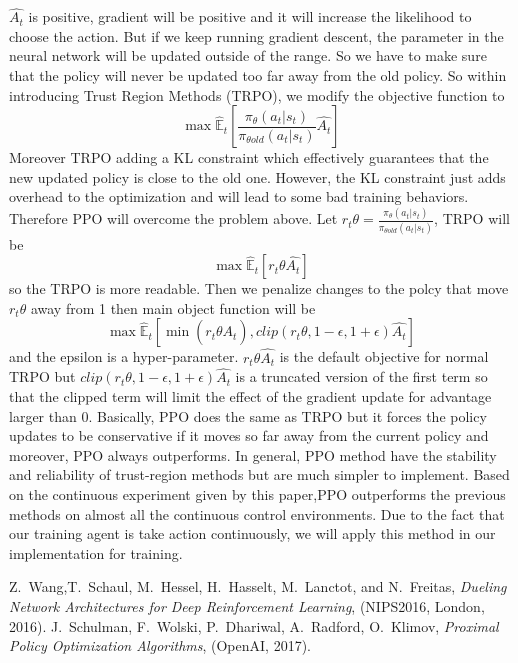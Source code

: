 \documentclass[%
,aps%
 ,twocolumn%
 ,secnumarabic%
,amssymb, amsmath,nobibnotes, aps, prl, floatfix]{revtex4-1}
\begin{document}
$\hat{A_t}$ is positive, gradient will be positive and it will increase the likelihood to choose the action. But if we keep running gradient descent, the parameter in the neural network will be updated outside of the range. So we have to make sure that the policy will never be updated too far away from the old policy. So within introducing Trust Region Methods (TRPO)\cite{SWPRK}, we modify the objective function to $$ \max\hat{\mathbb{E}}_{t}[\frac{\pi_{\theta}(a_{t}|s_{t})}{\pi_{\theta old}(a_{t}|s_{t})}\hat{A_t}] $$Moreover TRPO adding a KL constraint  which effectively guarantees that the new updated policy is close to the old one. However, the KL constraint just adds overhead to the optimization and will lead to some bad training behaviors. Therefore PPO will overcome the problem above.  Let  $r_{t}\theta = \frac{\pi_{\theta}(a_{t}|s_{t})}{\pi_{\theta old}(a_{t}|s_{t})}$, TRPO will be $$ \max\hat{\mathbb{E}}_{t}[r_{t}\theta \hat{A_t}] $$ so the TRPO is more readable. Then we penalize changes to the polcy that move $r_{t}\theta$ away from 1 then main object function will be $$ \max \hat{\mathbb{E}}_{t} [\min(r_{t}\theta \hat{A_t}), clip(r_{t}\theta,1-\epsilon,1+\epsilon)\hat{A_t}]$$ and the epsilon is a hyper-parameter. $r_{t}\theta \hat{A_t}$ is the default objective for normal TRPO but $clip(r_{t}\theta,1-\epsilon,1+\epsilon)\hat{A_t}$ is a truncated version of the first term so that the clipped term will limit the effect of the gradient update for advantage larger than 0\cite{SWPRK}. Basically, PPO does the same as TRPO but it forces the policy updates to be conservative if it moves so far away from the current policy and moreover, PPO always outperforms. In general, PPO method have the stability and reliability of trust-region methods but are much simpler to implement\cite{SWPRK}. Based on the continuous experiment given by this paper,PPO outperforms the previous methods on almost all the continuous control environments. Due to the fact that our training agent is take action continuously, we will apply this method in our implementation for training.


\begin{thebibliography}{}\label{sec:TeXbooks}
 Z.~Wang,T.~Schaul, M.~Hessel, H.~Hasselt, M.~Lanctot, and N.~Freitas, \textit{Dueling Network Architectures for Deep Reinforcement Learning}, (NIPS2016, London, 2016).
 J.~Schulman, F.~Wolski, P.~Dhariwal, A.~Radford, O.~Klimov, \textit{Proximal Policy Optimization Algorithms}, (OpenAI, 2017).
\end{thebibliography}
\end{document}
